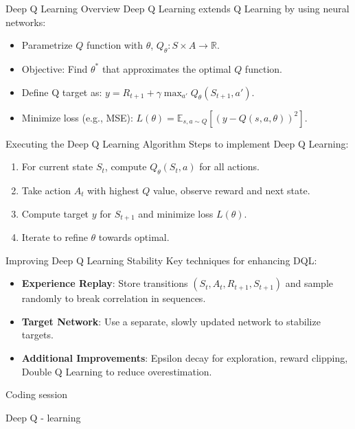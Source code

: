 \documentclass{beamer}
\begin{document}
\begin{frame}{Deep Q Learning Overview}
Deep Q Learning extends Q Learning by using neural networks:
\begin{itemize}
    \item Parametrize \(Q\) function with \(\theta\), \(Q_\theta : S \times A \rightarrow \mathbb{R}\).
    \item Objective: Find \(\theta^*\) that approximates the optimal \(Q\) function.
    \item Define Q target as: \(y = R_{t+1} + \gamma \max_{a'} Q_\theta(S_{t+1}, a')\).
    \item Minimize loss (e.g., MSE): \(L(\theta) = \mathbb{E}_{s,a \sim Q} [(y - Q(s,a,\theta))^2]\).
\end{itemize}
\end{frame}
\begin{frame}{Executing the Deep Q Learning Algorithm}
Steps to implement Deep Q Learning:
\begin{enumerate}
    \item For current state \(S_t\), compute \(Q_\theta(S_t, a)\) for all actions.
    \item Take action \(A_t\) with highest \(Q\) value, observe reward and next state.
    \item Compute target \(y\) for \(S_{t+1}\) and minimize loss \(L(\theta)\).
    \item Iterate to refine \(\theta\) towards optimal.
\end{enumerate}
\end{frame}
\begin{frame}{Improving Deep Q Learning Stability}
Key techniques for enhancing DQL:
\begin{itemize}
    \item \textbf{Experience Replay}: Store transitions \((S_t, A_t, R_{t+1}, S_{t+1})\) and sample randomly to break correlation in sequences.
    \item \textbf{Target Network}: Use a separate, slowly updated network to stabilize targets.
    \item \textbf{Additional Improvements}: Epsilon decay for exploration, reward clipping, Double Q Learning to reduce overestimation.
\end{itemize}
\end{frame}


\begin{frame}[plain,c]
\begin{center}
\Huge Coding session

Deep Q - learning
\end{center}
\end{frame}
\end{document}
